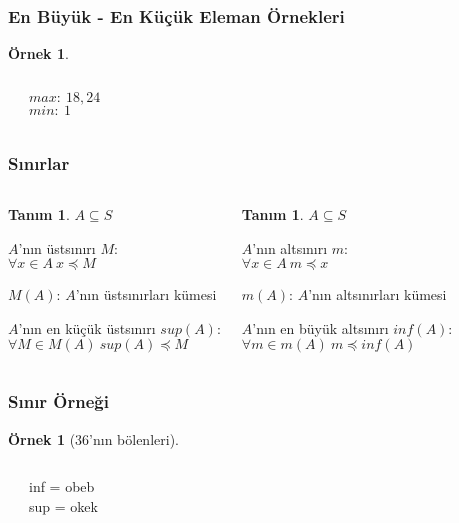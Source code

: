 \documentclass[dvipsnames]{beamer}
\theoremstyle{definition}
\newtheorem{tanim}[theorem]{Tanım}
\theoremstyle{example}
\newtheorem{ornek}[theorem]{Örnek}
\theoremstyle{plain}
\begin{document}
\begin{frame}
  \frametitle{En Büyük - En Küçük Eleman Örnekleri}

  \begin{ornek}
    \begin{columns}
      \begin{center}
      \end{center}

      $max:~18,24$\\
      $min:~1$
    \end{columns}
  \end{ornek}
\end{frame}

\begin{frame}
  \frametitle{Sınırlar}

  \begin{columns}[t]
    \begin{tanim}
      $A \subseteq S$

      \medskip
      $A$'nın \alert{üstsınırı} $M$:\\
      $\forall x \in A~x \preceq M$

      \bigskip
      $M(A)$: $A$'nın üstsınırları kümesi

      \medskip
      $A$'nın \alert{en küçük üstsınırı} $sup(A)$:\\
      $\forall M \in M(A)~sup(A) \preceq M$
    \end{tanim}

    \pause
    \begin{tanim}
      $A \subseteq S$

      \medskip
      $A$'nın \alert{altsınırı} $m$:\\
      $\forall x \in A~m \preceq x$

      \bigskip
      $m(A)$: $A$'nın altsınırları kümesi

      \medskip
      $A$'nın \alert{en büyük altsınırı} $inf(A)$:\\
      $\forall m \in m(A)~m \preceq inf(A)$
    \end{tanim}
  \end{columns}
\end{frame}

\begin{frame}
  \frametitle{Sınır Örneği}

  \begin{ornek}[36'nın bölenleri]
    \begin{columns}
      \begin{center}
      \end{center}

      inf = obeb\\
      sup = okek
    \end{columns}
  \end{ornek}
\end{frame}
\end{document}
